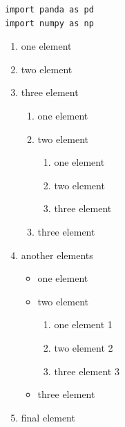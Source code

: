 \documentclass[12pt, twoside]{book}
\begin{document}
\begin{verbatim}
import panda as pd
import numpy as np
\end{verbatim}
\begin{enumerate}[topsep=1in]
    \item one element
    \item two element
    \item three element
        \begin{enumerate}
        \item one element
        \item two element
            \begin{enumerate}
            \item one element
            \item two element
            \item three element
            \end{enumerate}
    \item three element
\end{enumerate}
    \item another elements 
        \begin{itemize}
        \item[+] one element
        \item two element            
            \begin{enumerate}[label=(\arabic*)]
            \item one element 1
            \item two element 2
            \item three element 3
            \end{enumerate}
        \item three element
        \end{itemize}
    \item final element
\end{enumerate}
\end{document}

